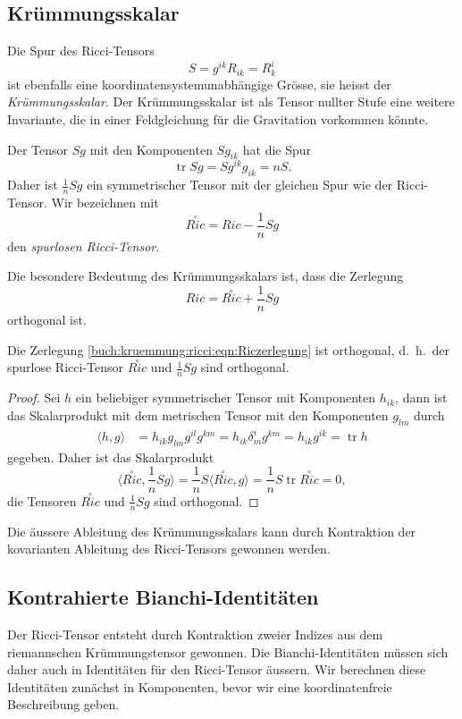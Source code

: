 %
%
\subsection{Krümmungsskalar}
Die Spur des Ricci-Tensors 
\[
S
=
g^{ik}R_{ik}
=
R^i_k
\]
ist ebenfalls eine koordinatensystemunabhängige Grösse, sie
heisst der {\em Krümmungsskalar}.
Der Krümmungsskalar ist als Tensor nullter Stufe eine weitere Invariante,
die in einer Feldgleichung für die Gravitation vorkommen könnte.

Der Tensor $Sg$ mit den Komponenten $Sg_{ik}$ hat die Spur
\[
\operatorname{tr} Sg
=
Sg^{ik}g_{ik}
=
nS.
\]
Daher ist $\frac1n Sg$ ein symmetrischer Tensor mit der gleichen
Spur wie der Ricci-Tensor. 
Wir bezeichnen mit
\[
\overset{\circ}{Ric}
=
Ric - \frac1n Sg
\]
den \emph{spurlosen Ricci-Tensor}.

Die besondere Bedeutung des Krümmungsskalars ist, dass die Zerlegung
\begin{equation}
Ric
=
\overset{\circ}{Ric} + \frac1n Sg
\label{buch:kruemmung:ricci:eqn:Riczerlegung}
\end{equation}
orthogonal ist.

\begin{satz}
Die Zerlegung \eqref{buch:kruemmung:ricci:eqn:Riczerlegung} ist
orthogonal, d.~h.~der spurlose Ricci-Tensor $\overset{\circ}{Ric}$
und $\frac1nSg$ sind orthogonal.
\end{satz}

\begin{proof}
Sei $h$ ein beliebiger symmetrischer Tensor mit Komponenten $h_{ik}$,
dann ist das Skalarprodukt mit dem metrischen Tensor mit den 
Komponenten $g_{lm}$ durch
\begin{align*}
\langle h,g\rangle
&=
h_{ik}g_{lm}
g^{il}g^{km}
=
h_{ik}\delta_m^i
g^{km}
=
h_{ik}g^{ik}
=
\operatorname{tr} h
\end{align*}
gegeben.
Daher ist das Skalarprodukt
\[
\langle \overset{\circ}{Ric},\frac{1}n Sg \rangle
=
\frac1nS\langle\overset{\circ}{Ric},g\rangle
=
\frac1nS\operatorname{tr}\overset{\circ}{Ric}
=
0,
\]
die Tensoren $\overset{\circ}{Ric}$ und $\frac1nSg$ sind orthogonal.
\end{proof}

Die äussere Ableitung des Krümmungsskalars kann durch Kontraktion
der kovarianten Ableitung des Ricci-Tensors gewonnen werden.

%
%
\subsection{Kontrahierte Bianchi-Identitäten}
Der Ricci-Tensor entsteht durch Kontraktion zweier Indizes aus dem
riemannschen Krümmungstensor gewonnen.
Die Bianchi-Identitäten müssen sich daher auch in Identitäten
für den Ricci-Tensor äussern.
Wir berechnen diese Identitäten zunächst in Komponenten, bevor wir
eine koordinatenfreie Beschreibung geben.

